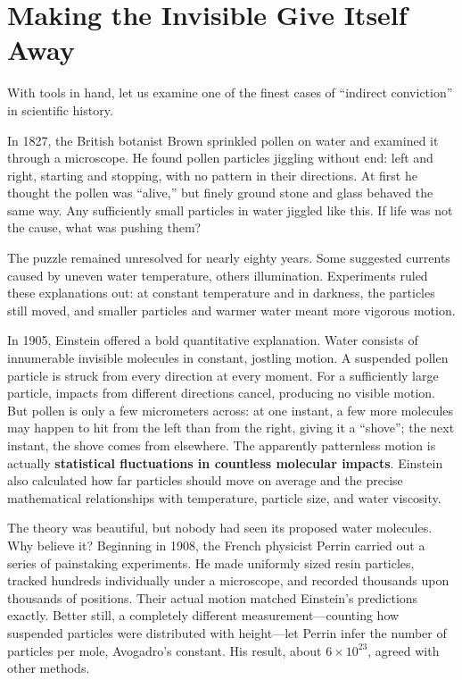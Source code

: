 \section{Making the Invisible Give Itself Away}

With tools in hand, let us examine one of the finest cases of ``indirect conviction'' in scientific history.

\begin{zhengju}
In 1827, the British botanist Brown sprinkled pollen on water and examined it through a microscope. He found pollen particles jiggling without end: left and right, starting and stopping, with no pattern in their directions. At first he thought the pollen was ``alive,'' but finely ground stone and glass behaved the same way. Any sufficiently small particles in water jiggled like this. If life was not the cause, what was pushing them?

The puzzle remained unresolved for nearly eighty years. Some suggested currents caused by uneven water temperature, others illumination. Experiments ruled these explanations out: at constant temperature and in darkness, the particles still moved, and smaller particles and warmer water meant more vigorous motion.

In 1905, Einstein offered a bold quantitative explanation. Water consists of innumerable invisible molecules in constant, jostling motion. A suspended pollen particle is struck from every direction at every moment. For a sufficiently large particle, impacts from different directions cancel, producing no visible motion. But pollen is only a few micrometers across: at one instant, a few more molecules may happen to hit from the left than from the right, giving it a ``shove''; the next instant, the shove comes from elsewhere. The apparently patternless motion is actually \textbf{statistical fluctuations in countless molecular impacts}. Einstein also calculated how far particles should move on average and the precise mathematical relationships with temperature, particle size, and water viscosity.

The theory was beautiful, but nobody had seen its proposed water molecules. Why believe it? Beginning in 1908, the French physicist Perrin carried out a series of painstaking experiments. He made uniformly sized resin particles, tracked hundreds individually under a microscope, and recorded thousands upon thousands of positions. Their actual motion matched Einstein's predictions exactly. Better still, a completely different measurement---counting how suspended particles were distributed with height---let Perrin infer the number of particles per mole, Avogadro's constant. His result, about $6\times 10^{23}$, agreed with other methods.


\end{zhengju}

